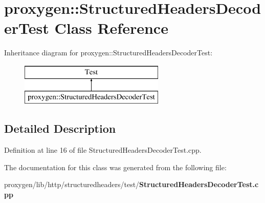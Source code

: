 \section{proxygen\+:\+:Structured\+Headers\+Decoder\+Test Class Reference}
\label{classproxygen_1_1StructuredHeadersDecoderTest}
Inheritance diagram for proxygen\+:\+:Structured\+Headers\+Decoder\+Test\+:\begin{figure}[H]
\begin{center}
\leavevmode
\includegraphics[height=2.000000cm]{classproxygen_1_1StructuredHeadersDecoderTest}
\end{center}
\end{figure}


\subsection{Detailed Description}


Definition at line 16 of file Structured\+Headers\+Decoder\+Test.\+cpp.



The documentation for this class was generated from the following file\+:\begin{DoxyCompactItemize}
\item 
proxygen/lib/http/structuredheaders/test/{\bf Structured\+Headers\+Decoder\+Test.\+cpp}\end{DoxyCompactItemize}
